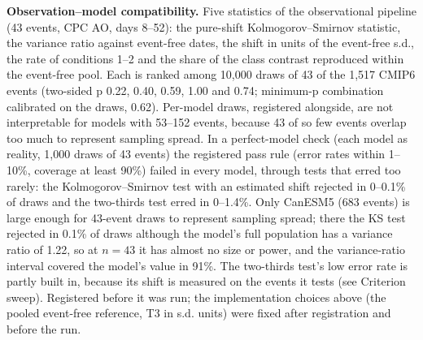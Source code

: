 \documentclass[11pt]{article}
\begin{document}
\textbf{Observation–model compatibility.} Five statistics of the observational pipeline (43 events, CPC AO, days 8–52): the pure-shift Kolmogorov–Smirnov statistic, the variance ratio against event-free dates, the shift in units of the event-free s.d., the rate of conditions 1–2 and the share of the class contrast reproduced within the event-free pool. Each is ranked among 10,000 draws of 43 of the 1,517 CMIP6 events (two-sided p 0.22, 0.40, 0.59, 1.00 and 0.74; minimum-p combination calibrated on the draws, 0.62). Per-model draws, registered alongside, are not interpretable for models with 53–152 events, because 43 of so few events overlap too much to represent sampling spread. In a perfect-model check (each model as reality, 1,000 draws of 43 events) the registered pass rule (error rates within 1–10\%, coverage at least 90\%) failed in every model, through tests that erred too rarely: the Kolmogorov–Smirnov test with an estimated shift rejected in 0–0.1\% of draws and the two-thirds test erred in 0–1.4\%. Only CanESM5 (683 events) is large enough for 43-event draws to represent sampling spread; there the KS test rejected in 0.1\% of draws although the model's full population has a variance ratio of 1.22, so at $n = 43$ it has almost no size or power, and the variance-ratio interval covered the model's value in 91\%. The two-thirds test's low error rate is partly built in, because its shift is measured on the events it tests (see Criterion sweep). Registered before it was run; the implementation choices above (the pooled event-free reference, T3 in s.d. units) were fixed after registration and before the run.
\end{document}
